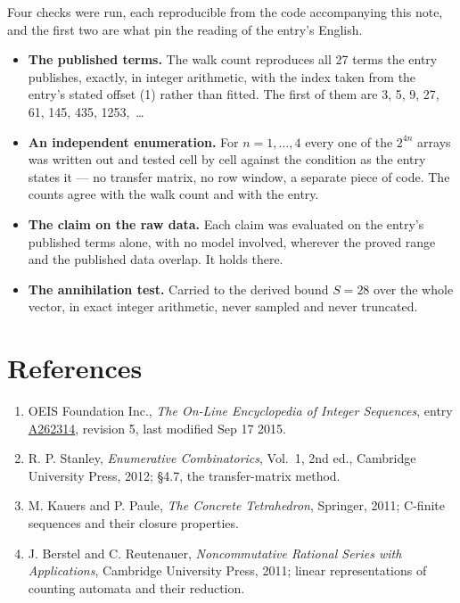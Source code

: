 \documentclass[11pt]{article}
\theoremstyle{definition}
\begin{document}
Four checks were run, each reproducible from the code accompanying this note, and the first two are what pin the reading of the entry's English.

\begin{itemize}

\item {\bfseries The published terms.} The walk count reproduces all 27 terms the entry publishes, exactly, in integer arithmetic, with the index taken from the entry's stated offset (1) rather than fitted. The first of them are 3, 5, 9, 27, 61, 145, 435, 1253,~\dots

\item {\bfseries An independent enumeration.} For $n = 1,\dots,4$ every one of the $2^{4n}$ arrays was written out and tested cell by cell against the condition as the entry states it --- no transfer matrix, no row window, a separate piece of code. The counts agree with the walk count and with the entry.

\item {\bfseries The claim on the raw data.} Each claim was evaluated on the entry's published terms alone, with no model involved, wherever the proved range and the published data overlap. It holds there.

\item {\bfseries The annihilation test.} Carried to the derived bound $S = 28$ over the whole vector, in exact integer arithmetic, never sampled and never truncated.

\end{itemize}

\section{References}

\begin{enumerate}

\item OEIS Foundation Inc., \emph{The On-Line Encyclopedia of Integer Sequences}, entry \href{https://oeis.org/A262314}{A262314}, revision 5, last modified Sep 17 2015.

\item R. P. Stanley, \emph{Enumerative Combinatorics}, Vol.~1, 2nd ed., Cambridge University Press, 2012; \S4.7, the transfer-matrix method.

\item M. Kauers and P. Paule, \emph{The Concrete Tetrahedron}, Springer, 2011; C-finite sequences and their closure properties.

\item J. Berstel and C. Reutenauer, \emph{Noncommutative Rational Series with Applications}, Cambridge University Press, 2011; linear representations of counting automata and their reduction.

\end{enumerate}
\end{document}
